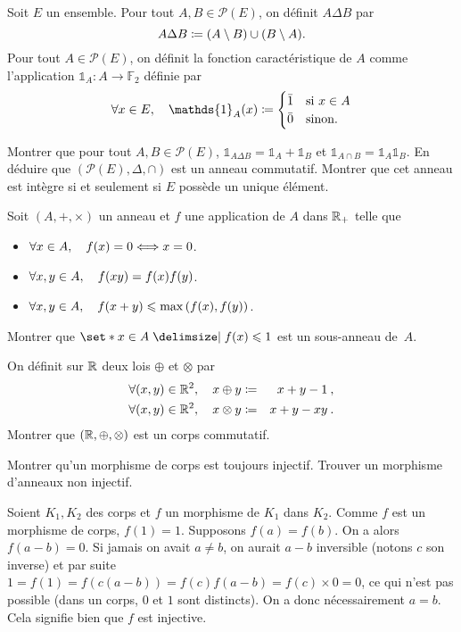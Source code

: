 \documentclass{magnolia}
\begin{document}


Soit $E$ un ensemble. Pour tout $A,B\in\mathcal{P}(E)$, on définit $A\Delta B$ par
\[A\Delta B\coloneqq(A\setminus B)\cup(B\setminus A).\]
Pour tout $A\in\mathcal{P}(E)$, on définit la fonction caractéristique de $A$ comme
l'application $\mathds{1}_A:A\to\mathbb{F}_2$ définie par
\[\forall x\in E \qsep \mathds{1}_A(x)\defeq
\begin{cases}
\bar{1} & \text{si $x\in A$}\\
\bar{0} & \text{sinon.}
\end{cases}\]
\begin{questions}
\question Montrer que pour tout $A,B\in\mathcal{P}(E)$,
  $\mathds{1}_{A\Delta B}=\mathds{1}_A + \mathds{1}_B$ et
  $\mathds{1}_{A\cap B}=\mathds{1}_A \mathds{1}_B$.
\question En déduire que $(\mathcal{P}(E),\Delta,\cap)$ est un anneau commutatif.
\question Montrer que cet anneau est intègre si et seulement si $E$ possède un unique
  élément.
\end{questions}

Soit $(A,+,\times)$ un anneau et $f$ une application de $A$ dans $\mathbb{R}_+$ telle
que
\begin{itemize}
\item $\forall x\in A ,\quad f(x)=0 \Longleftrightarrow x=0$.
\item $\forall x,y\in A ,\quad f(xy)=f(x)f(y)$.
\item $\forall x,y\in A ,\quad f(x+y)\leqslant \max\left(f(x),f(y)\right)$.
\end{itemize}
Montrer que $\enstq{x\in A}{f(x)\leq 1}$ est un sous-anneau de~$A$.


On définit sur $\mathbb{R}$ deux lois $\oplus$ et $\otimes$ par
\begin{eqnarray*}
\forall(x,y)\in\mathbb{R}^2,\quad x\oplus y&\coloneqq&x+y-1\>,\\
\forall(x,y)\in\mathbb{R}^2,\quad x\otimes y&\coloneqq&x+y-xy\>.
\end{eqnarray*}
Montrer que $(\mathbb{R},\oplus,\otimes)$ est un corps commutatif.

Montrer qu'un morphisme de corps est toujours injectif. Trouver un morphisme
d'anneaux non injectif.

\begin{sol}
Soient $K_1, K_2$ des corps et $f$ un morphisme de $K_1$ dans $K_2$. Comme $f$ est un morphisme de corps, $f(1)=1$. Supposons $f(a)=f(b)$. On a alors $f(a-b)=0$. Si jamais on avait $a \neq b$, on aurait $a-b$ inversible (notons $c$ son inverse) et par suite $1=f(1)=f(c(a-b))=f(c)f(a-b)=f(c)\times 0=0$, ce qui n'est pas possible (dans un corps, $0$ et $1$ sont distincts). On a donc nécessairement $a=b$. Cela signifie bien que $f$ est injective.
\end{sol}
\end{document}
